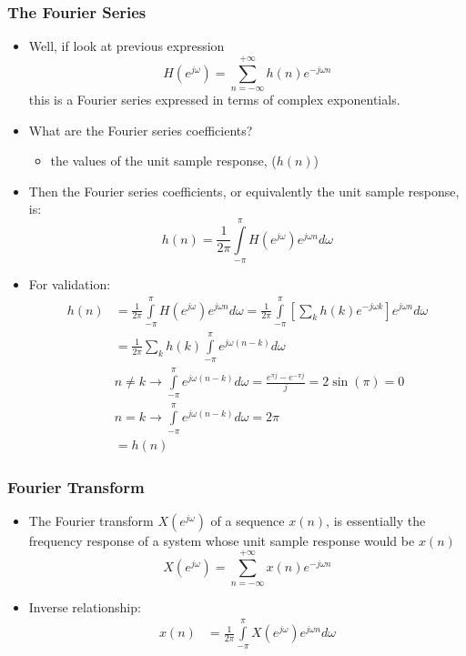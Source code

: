 \documentclass[pdflatex,compress,mathserif]{beamer}
\begin{document}
\begin{frame}
	\frametitle{The Fourier Series}
	\begin{itemize}
		\item Well, if look at previous expression
		\[ H(e^{j\omega}) = \sum\limits_{n = -\infty}^{+\infty} h(n) e^{-j \omega n} \]
		this is a Fourier series expressed in terms of complex exponentials.
		\item What are the Fourier series coefficients?
		\begin{itemize}
			\item the values of the unit sample response, ($ h(n) $)
		\end{itemize}
		\item Then the Fourier series coefficients, or equivalently the unit sample response, is:
			\[ h(n) = \frac{1}{2\pi}\int\limits_{-\pi}^{\pi} H(e^{j\omega})e^{j\omega n} d\omega\]
	\end{itemize}
\end{frame}

\begin{frame}
	\begin{itemize}
		\item For validation:
		\begin{align*}
			h(n) &= \frac{1}{2\pi}\int\limits_{-\pi}^{\pi} H(e^{j\omega})e^{j\omega n} d\omega = \frac{1}{2\pi}\int\limits_{-\pi}^{\pi} \left[ \sum\limits_{k} h(k) e^{-j \omega k} \right]e^{j\omega n} d\omega \\
			&= \frac{1}{2\pi} \sum\limits_{k} h(k) \int\limits_{-\pi}^{\pi} e^{j\omega (n-k)} d\omega \\
			& n \neq k \rightarrow \int\limits_{-\pi}^{\pi} e^{j\omega (n-k)} d\omega = \frac{e^{\pi j}-e^{-\pi j}}{j} = 2\sin(\pi) = 0\\
			& n = k \rightarrow \int\limits_{-\pi}^{\pi} e^{j\omega (n-k)} d\omega = 2 \pi \\
			&= h(n)
		\end{align*}
	\end{itemize}
\end{frame}

\begin{frame}
	\frametitle{Fourier Transform}
	\begin{itemize}
		\item The Fourier transform $ X(e^{j \omega}) $ of a sequence $ x(n) $, is essentially the frequency response of a system whose unit sample response would be $ x(n) $
		\[ X(e^{j \omega}) = \sum_{n = - \infty}^{+\infty} x(n) e^{-j \omega n} \]
		\item Inverse relationship:
		\begin{align*}
			x(n) &= \frac{1}{2\pi}\int\limits_{-\pi}^{\pi}X(e^{j \omega}) e^{j \omega n} d\omega \\
		\end{align*}
	\end{itemize}
\end{frame}
\end{document}
